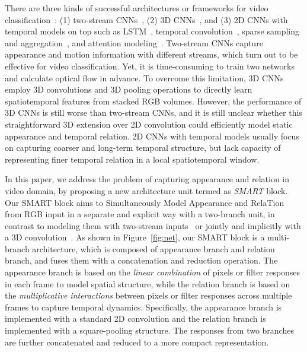 \documentclass[10pt,twocolumn,letterpaper]{article}
\begin{document}
There are three kinds of successful architectures or frameworks for video classification~\cite{CarreiraZ17}: (1) two-stream CNNs~\cite{SimonyanZ14}, (2) 3D CNNs~\cite{JiXYY13,TranBFTP15}, and (3) 2D CNNs with temporal models on top such as LSTM~\cite{DonahueHGRVDS15,NgHVVMT15}, temporal convolution~\cite{NgHVVMT15}, sparse sampling and aggregation~\cite{WangXWQLTV16}, and attention modeling~\cite{WangXLV17,winner17,GanWYYH15}. Two-stream CNNs capture appearance and motion information with different streams, which turn out to be effective for video classification. Yet, it is time-consuming to train two networks and calculate optical flow in advance. To overcome this limitation, 3D CNNs employ 3D convolutions and 3D pooling operations to directly learn spatiotemporal features from stacked RGB volumes. However, the performance of 3D CNNs is still worse than two-stream CNNs, and it is still unclear whether this straightforward 3D extension over 2D convolution could efficiently model static appearance and temporal relation. 2D CNNs with temporal models usually focus on capturing coarser and long-term temporal structure, but lack capacity of representing finer temporal relation in a local spatiotemporal window.

In this paper, we address the problem of capturing appearance and relation in video domain, by proposing a new architecture unit termed as {\em SMART} block. Our SMART block aims to Simultaneously Model Appearance and RelaTion from RGB input in a separate and explicit way with a two-branch unit, in contrast to modeling them with two-stream inputs~\cite{SimonyanZ14} or jointly and implicitly with a 3D convolution~\cite{TranBFTP15}. As shown in Figure~\ref{fig:net}, our SMART block is a multi-branch architecture, which is composed of appearance branch and relation branch, and fuses them with a concatenation and reduction operation. The appearance branch is based on the {\em linear combination} of pixels or filter responses in each frame to model spatial structure, while the relation branch is based on the {\em multiplicative interactions} between pixels or filter responses across multiple frames to capture temporal dynamics. Specifically, the appearance branch is implemented with a standard 2D convolution and the relation branch is implemented with a square-pooling structure. The responses from two branches are further concatenated and reduced to a more compact representation.
\end{document}
